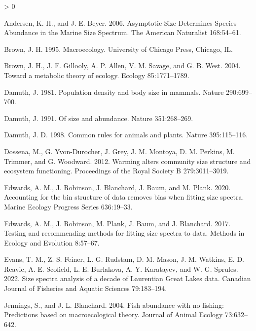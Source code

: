 \documentclass[
]{article}
\newlength{\cslhangindent}
\newenvironment{CSLReferences}[2] %
 {%
  \setlength{\parindent}{0pt}
  \ifodd #1 \everypar{\setlength{\hangindent}{\cslhangindent}}\ignorespaces\fi
  \ifnum #2 > 0
  \setlength{\parskip}{#2\baselineskip}
  \fi
 }%
 {}
\begin{document}
\hypertarget{refs}{}
\begin{CSLReferences}{1}{0}
\leavevmode\hypertarget{ref-Andersen2006a}{}%
Andersen, K. H., and J. E. Beyer. 2006. Asymptotic {Size Determines
Species Abundance} in the {Marine Size Spectrum}. The American
Naturalist 168:54--61.

\leavevmode\hypertarget{ref-brown1995}{}%
Brown, J. H. 1995. Macroecology. {University of Chicago Press},
{Chicago, IL}.

\leavevmode\hypertarget{ref-Brown2004}{}%
Brown, J. H., J. F. Gillooly, A. P. Allen, V. M. Savage, and G. B. West.
2004. Toward a metabolic theory of ecology. Ecology 85:1771--1789.

\leavevmode\hypertarget{ref-Damuth1981}{}%
Damuth, J. 1981. Population density and body size in mammals. Nature
290:699--700.

\leavevmode\hypertarget{ref-Damuth1991}{}%
Damuth, J. 1991. Of size and abundance. Nature 351:268--269.

\leavevmode\hypertarget{ref-Damuth1998}{}%
Damuth, J. D. 1998. Common rules for animals and plants. Nature
395:115--116.

\leavevmode\hypertarget{ref-dossena2012}{}%
Dossena, M., G. Yvon-Durocher, J. Grey, J. M. Montoya, D. M. Perkins, M.
Trimmer, and G. Woodward. 2012. Warming alters community size structure
and ecosystem functioning. Proceedings of the Royal Society B
279:3011--3019.

\leavevmode\hypertarget{ref-edwards2020}{}%
Edwards, A. M., J. Robinson, J. Blanchard, J. Baum, and M. Plank. 2020.
Accounting for the bin structure of data removes bias when fitting size
spectra. Marine Ecology Progress Series 636:19--33.

\leavevmode\hypertarget{ref-edwards2017}{}%
Edwards, A. M., J. Robinson, M. Plank, J. Baum, and J. Blanchard. 2017.
Testing and recommending methods for fitting size spectra to data.
Methods in Ecology and Evolution 8:57--67.

\leavevmode\hypertarget{ref-evans2022}{}%
Evans, T. M., Z. S. Feiner, L. G. Rudstam, D. M. Mason, J. M. Watkins,
E. D. Reavie, A. E. Scofield, L. E. Burlakova, A. Y. Karatayev, and W.
G. Sprules. 2022. Size spectra analysis of a decade of {Laurentian Great
Lakes} data. Canadian Journal of Fisheries and Aquatic Sciences
79:183--194.

\leavevmode\hypertarget{ref-jennings2004}{}%
Jennings, S., and J. L. Blanchard. 2004. Fish abundance with no fishing:
Predictions based on macroecological theory. Journal of Animal Ecology
73:632--642.


\end{CSLReferences}
\end{document}
